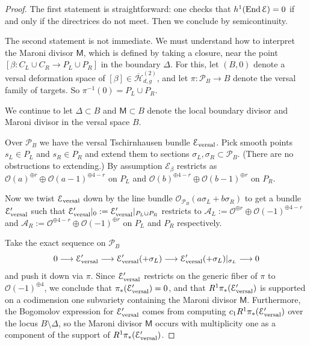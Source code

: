 \documentclass[reqno, 10 pt]{article}
\theoremstyle{definition}
\theoremstyle{remark}
\numberwithin{equation}{section}
\numberwithin{thm}{section}
\numberwithin{prop}{section}
\numberwithin{lem}{section}
\numberwithin{cor}{section}
\numberwithin{conj}{section}
\numberwithin{defn}{section}
\renewcommand{\H}{\mathcal H}
\newcommand{\Hdgnt}{\overline{\H}_{d,g}^{(2)}}
\renewcommand{\to}{\longrightarrow}
\newcommand{\sfM}{{\mathsf M}}
\newcommand{\cA}{{\mathcal A}}
\newcommand{\cE}{{\mathcal E}}
\newcommand{\cO}{{\mathcal O}}
\newcommand{\cP}{{\mathcal P}}
\newcommand {\from}{{\colon}}
\renewcommand{\H}{{\mathcal{H}}}
\newcommand {\End}{{\rm End \,}}
\begin{document}
\begin{proof}

The first statement is straightforward: one checks that $h^{1}(\End \cE) = 0$ if and only if the directrices do not meet. Then we conclude by semicontinuity. 


The second statement is not immediate.  We must understand how to interpret the Maroni divisor $\sfM$, which is defined by taking a closure, near the point $[\beta \from C_{L} \cup C_{R} \to P_{L} \cup P_{R}]$ in the boundary $\Delta$. 
For this, let $(B, 0)$ denote a versal deformation space of $[\beta] \in \Hdgnt$, and let $\pi \from \cP_{B} \to B$ denote the versal family of targets. So $\pi^{-1}(0) = P_{L} \cup P_{R}$. 

We continue to let $\Delta \subset B$ and $\sfM \subset B$ denote the local boundary divisor and Maroni divisor in the versal space $B$. 

Over $\cP_{B}$ we have the versal Tschirnhausen bundle $\cE_{\rm versal}$. Pick smooth points $s_{L} \in P_{L}$ and $s_{R} \in P_{R}$ and extend them to sections $\sigma_{L}, \sigma_{R} \subset \cP_{B}$. (There are no obstructions to extending.) By assumption $\cE_{\beta}$ restricts as $\cO(a)^{\oplus r} \oplus \cO(a-1)^{\oplus 4-r}$ on $P_{L}$ and $\cO(b)^{\oplus 4-r} \oplus \cO(b-1)^{\oplus r}$ on $P_{R}$.

Now we twist $\cE_{\rm versal}$ down by the line bundle $\cO_{\cP_{B}}(a\sigma_{L} + b\sigma_{R})$ to get a bundle $\cE'_{{\rm versal}}$ such that $\cE'_{{\rm versal}}|_{0} := \cE'_{{\rm versal}}|_{P_{L}\cup P_{R}}$ restricts to $\cA_{L} := \cO^{\oplus r} \oplus \cO(-1)^{\oplus 4-r}$  and $\cA_{R} := \cO^{\oplus 4-r} \oplus \cO(-1)^{\oplus r}$ on $P_{L}$ and $P_{R}$ respectively.

Take the exact sequence on $\cP_{B}$ \[0 \to \cE'_{{\rm versal}} \to \cE'_{{\rm versal}}(+\sigma_{L}) \to \cE'_{{\rm versal}}(+\sigma_{L})|_{\sigma_{L}} \to 0\] and push it down via $\pi$.  Since $\cE'_{{\rm versal}}$ restricts on the generic fiber of $\pi$ to $\cO(-1)^{\oplus 4}$, we conclude that $\pi_{*}(\cE'_{{\rm versal}}) = 0$, and that $R^{1}\pi_{*}(\cE'_{{\rm versal}})$ is supported on a codimension one subvariety containing the Maroni divisor $\sfM$. Furthermore, the Bogomolov expression for $\cE'_{\rm versal}$ comes from computing $c_{1}R^{1}\pi_{*}(\cE'_{{\rm versal}})$ over the locus $B \setminus \Delta$, so the Maroni divisor $\sfM$ occurs with multiplicity one as a component of the support of $R^{1}\pi_{*}(\cE'_{{\rm versal}})$.


\end{proof}
\end{document}
